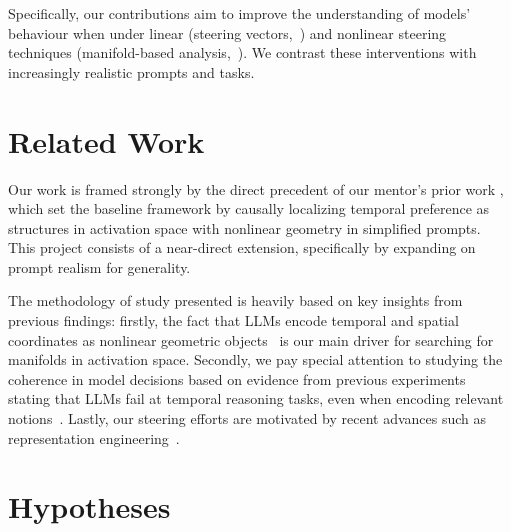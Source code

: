 \documentclass[midterm]{sparreport}
\begin{document}
Specifically, our contributions aim to improve the understanding of models' behaviour when under linear (steering vectors,~\cite{turner2023steering,panickssery2024steering}) and nonlinear steering techniques (manifold-based analysis,~\cite{raval2026curveball,li2026steering}). We contrast these interventions with increasingly realistic prompts and tasks.

\section{Related Work}

Our work is framed strongly by the direct precedent of our mentor's prior work \cite{riossialer2026temporal}, which set the baseline framework by causally localizing temporal preference as structures in activation space with nonlinear geometry in simplified prompts. This project consists of a near-direct extension, specifically by expanding on prompt realism for generality.

The methodology of study presented is heavily based on key insights from previous findings: firstly, the fact that LLMs encode temporal and spatial coordinates as nonlinear geometric objects~\cite{gurnee2024language,engels2025not,modell2025origins,tiblias2026hypothesis} is our main driver for searching for manifolds in activation space. Secondly, we pay special attention to studying the coherence in model decisions based on evidence from previous experiments stating that LLMs fail at temporal reasoning tasks, even when encoding relevant notions~\cite{wang2024tram,fatemi2024test,liu2025time,wallat2025study,herel2024time,sehgal2026real}. Lastly, our steering efforts are motivated by recent advances such as representation engineering~\cite{zou2023representation}.

\section{Hypotheses}
\end{document}
